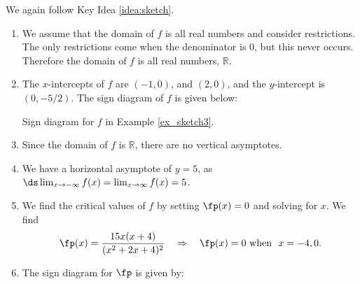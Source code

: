 {We again follow Key Idea \ref{idea:sketch}.
	\begin{enumerate}
	\item		We assume that the domain of $f$ is all real numbers and consider restrictions. The only restrictions come when the denominator is 0, but this never occurs. Therefore the domain of $f$ is all real numbers, $\mathbb{R}$.
\item The $x$-intercepts of $f$ are $(-1,0)$, and $(2,0)$, and the $y$-intercept is $(0,-5/2)$. The sign diagram of $f$ is given below:

\noindent\begin{minipage}{\textwidth}
\begin{center}
\end{center}
\captionsetup{type=figure}%
			\caption{Sign diagram for $f$ in Example \ref{ex_sketch3}.}\label{fig:sketchline3f}
\end{minipage}	

    \item Since the domain of $f$ is $\mathbb{R}$, there are no vertical asymptotes.
    
    \item		We have a horizontal asymptote of $y=5$, as $\ds \lim_{x\to-\infty}f(x) = \lim_{x\to\infty}f(x) = 5$.
    
	\item		We find the critical values of $f$ by setting $\fp(x)=0$ and solving for $x$. We find 
\[
\fp(x) = \frac{15x(x+4)}{(x^2+2x+4)^2} \quad \Rightarrow \quad \fp(x) = 0 \text{ when } \ x=-4,0.
\]

	\item The sign diagram for $\fp$ is given by:
	

\end{enumerate}}
